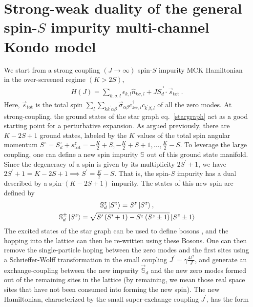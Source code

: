 \documentclass[reprint,prb,superscriptaddress]{revtex4-2}
\begin{document}
\section{Strong-weak duality of the general spin-\(S\) impurity multi-channel Kondo model}
We start from a strong coupling \((J \to \infty)\) spin-\(S\) impurity MCK Hamiltonian in the over-screened regime \(\left( K > 2S \right) \),
\begin{equation}\begin{aligned}
	\label{strong_ham}
	H(J) = \sum_{k,\sigma,l}\epsilon_{k,l} \hat n_{k\sigma,l} + J \vec{S_d}\cdot\vec{s}_\text{tot}~.
\end{aligned}\end{equation}
Here, \(\vec s_\text{tot}\) is the total spin \(\sum_l \sum_{kk^\prime \alpha\beta} \vec \sigma_{\alpha\beta}c^\dagger_{k\alpha,l}c_{k^\prime\beta,l}\) of all the zero modes. At strong-coupling, the ground states of the star graph eq.~\ref{stargraph} act as a good starting point for a perturbative expansion. As argued previously, there are \(K-2S+1\) ground states, labeled by the \(K\) values of the total spin angular momentum \(S^z = S_d^z + s_\text{tot}^z = -\frac{K}{2} + S, -\frac{K}{2} + S + 1, \ldots, \frac{K}{2} - S\). To leverage the large coupling, one can define a new spin impurity \(\mathbb{S}\) out of this ground state manifold. Since the degeneracy of a spin is given by its multiplicity \(2S^\prime + 1\), we have \(2S^\prime + 1 = K-2S+1 \implies S^\prime = \frac{K}{2} - S\). That is, the spin-\(S\) impurity has a dual described by a spin-\((K-2S+1)\) impurity. The states of this new spin are defined by
\begin{gather}
	\mathbb{S}_d^z \ket{S^z} = S^z \ket{S^z},\nonumber\\
	\mathbb{S}_d^\pm \ket{S^z} = \sqrt{S^\prime\left( S^\prime + 1 \right) - S^z\left( S^z \pm 1\right)} \ket{S^z \pm 1}
\end{gather}
The excited states of the star graph can be used to define bosons \cite{kroha_kolf_2007}, and the hopping into the lattice can then be re-written using these Bosons. One can then remove the single-particle hoping between the zero modes and the first sites using a Schrieffer-Wolff transformation in the small coupling \(J^\prime = \gamma \frac{4t^2}{J}\), and generate an exchange-coupling between the new impurity \(\vec {\mathbb{S}}_d\) and the new zero modes formed out of the remaining sites in the lattice \cite{kroha_kolf_2007} (by remaining, we mean those real space sites that have not been consumed into forming the new spin). The new Hamiltonian, characterized by the small super-exchange  coupling \(J^\prime\), has the form
\end{document}
